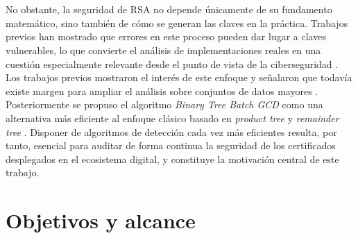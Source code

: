 \\
\\
No obstante, la seguridad de RSA no depende únicamente de su fundamento matemático, sino también de cómo se generan las claves en la práctica. Trabajos previos han mostrado que errores en este proceso pueden dar lugar a claves vulnerables, lo que convierte el análisis de implementaciones reales en una cuestión especialmente relevante desde el punto de vista de la ciberseguridad \citep{heninger2012mining,vage2022finding,pelofske2024efficient}. Los trabajos previos mostraron el interés de este enfoque y señalaron que todavía existe margen para ampliar el análisis sobre conjuntos de datos mayores \citep{vage2022finding}. Posteriormente se propuso el algoritmo \textit{Binary Tree Batch GCD} como una alternativa más eficiente al enfoque clásico basado en \textit{product tree} y \textit{remainder tree} \citep{pelofske2024efficient}. Disponer de algoritmos de detección cada vez más eficientes resulta, por tanto, esencial para auditar de forma continua la seguridad de los certificados desplegados en el ecosistema digital, y constituye la motivación central de este trabajo.

\section{Objetivos y alcance}


